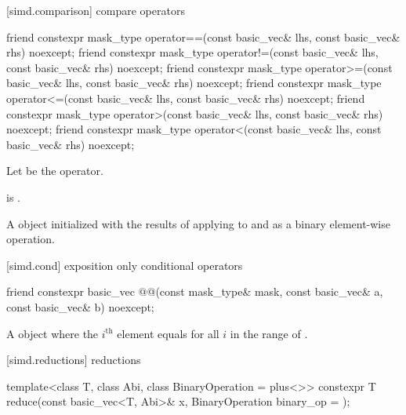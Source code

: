 [simd.comparison]{ compare operators}

\begin{itemdecl}
friend constexpr mask_type operator==(const basic_vec& lhs, const basic_vec& rhs) noexcept;
friend constexpr mask_type operator!=(const basic_vec& lhs, const basic_vec& rhs) noexcept;
friend constexpr mask_type operator>=(const basic_vec& lhs, const basic_vec& rhs) noexcept;
friend constexpr mask_type operator<=(const basic_vec& lhs, const basic_vec& rhs) noexcept;
friend constexpr mask_type operator>(const basic_vec& lhs, const basic_vec& rhs) noexcept;
friend constexpr mask_type operator<(const basic_vec& lhs, const basic_vec& rhs) noexcept;
\end{itemdecl}

\begin{itemdescr}
\pnum
Let  be the operator.

\pnum
\constraints
{} is
.

\pnum
\returns
A  object initialized with the results of applying
 to  and  as a binary element-wise
operation.
\end{itemdescr}

[simd.cond]{ exposition only conditional operators}

\begin{itemdecl}
friend constexpr basic_vec
@@(const mask_type& mask, const basic_vec& a, const basic_vec& b) noexcept;
\end{itemdecl}

\begin{itemdescr}
\pnum
\returns
A  object where the $i^\text{th}$ element equals
 for all $i$ in the range of
.
\end{itemdescr}

[simd.reductions]{ reductions}

\begin{itemdecl}
template<class T, class Abi, class BinaryOperation = plus<>>
  constexpr T reduce(const basic_vec<T, Abi>& x, BinaryOperation binary_op = {});
\end{itemdecl}

